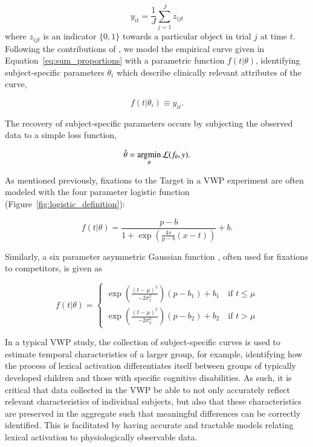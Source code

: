 \begin{equation}\label{eq:sum_proportions}
y_{it} = \frac1J \sum_{j=1}^J z_{ijt}
\end{equation}
where $z_{ijt}$ is an indicator $\{0, 1\}$  towards a particular object in trial $j$ at time $t$. Following the contributions of \citet{mcmurray2010individual}, we model the empirical curve given in Equation~\ref{eq:sum_proportions} with a parametric function $f(t|\theta)$, identifying subject-specific parameters $\theta_i$ which describe clinically relevant attributes of the curve, 

\begin{equation}\label{eq:empir_to_activation}
f(t | \theta_i) \equiv y_{it}.
\end{equation}

The recovery of subject-specific parameters occurs by subjecting the observed data to a simple loss function, 

\begin{equation}\label{eq:prop_loss}
\hat{\theta} = \operatorname*{arg\!\min}_{\theta} \mathcal{L}(f_{\theta}, y).
\end{equation}

As mentioned previously, fixations to the Target in a VWP experiment are often modeled with the four parameter logistic function (Figure~\ref{fig:logistic_definition}):

\begin{equation} \label{eq:logistic1}
f(t|\theta) = \frac{p-b}{1 + \exp \left(\frac{4s}{\text{p}-b} (x - t) \right)} + b.
\end{equation}

Similarly, a six parameter asymmetric Gaussian function , often used for fixations to competitors, is given as

\begin{equation} \label{eq:dg2}
f(t|\theta) = \begin{cases}
\exp \left( \frac{(t - \mu)^2}{-2\sigma_1^2} \right) (p - b_1) + b_1 \quad \text{if } t \leq \mu \\
\exp \left( \frac{(t - \mu)^2}{-2\sigma_2^2} \right) (p - b_2) + b_2 \quad \text{if } t > \mu
\end{cases}
\end{equation}


In a typical VWP study, the collection of subject-specific curves is used to estimate temporal characteristics of a larger group, for example, identifying how the process of lexical activation differentiates itself between groups of typically developed children and those with specific cognitive disabilities. As such, it is critical that data collected in the VWP be able to not only accurately reflect relevant characteristics of individual subjects, but also that these characteristics are preserved in the aggregate such that meaningful differences can be correctly identified. This is facilitated by having accurate and tractable models relating lexical activation to physiologically observable data. 

